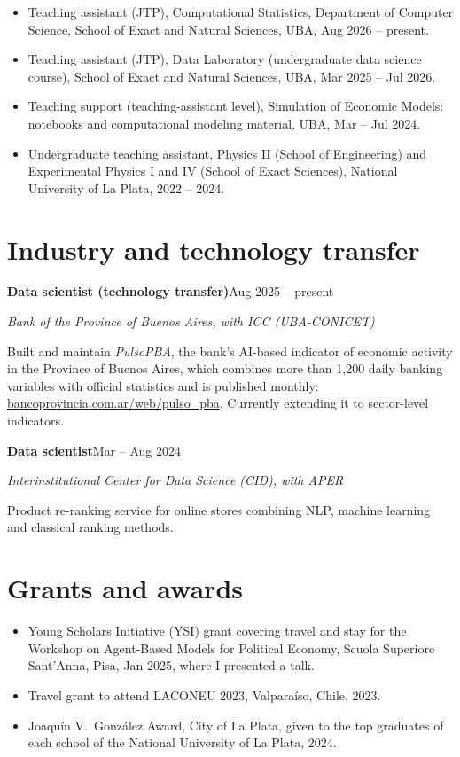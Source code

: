 \documentclass[10pt]{article}
\newcommand{\entry}[3]{{\bfseries #1}\hfill{\color{muted}\small #3}\par{\color{accent}\itshape #2}\par}
\begin{document}
\begin{itemize}
  \item Teaching assistant (JTP), Computational Statistics, Department of Computer Science, School of Exact and Natural Sciences, UBA, Aug 2026 -- present.
  \item Teaching assistant (JTP), Data Laboratory (undergraduate data science course), School of Exact and Natural Sciences, UBA, Mar 2025 -- Jul 2026.
  \item Teaching support (teaching-assistant level), Simulation of Economic Models: notebooks and computational modeling material, UBA, Mar -- Jul 2024.
  \item Undergraduate teaching assistant, Physics II (School of Engineering) and Experimental Physics I and IV (School of Exact Sciences), National University of La Plata, 2022 -- 2024.
\end{itemize}

\section{Industry and technology transfer}

\entry{Data scientist (technology transfer)}{Bank of the Province of Buenos Aires, with ICC (UBA-CONICET)}{Aug 2025 -- present}
Built and maintain \emph{PulsoPBA}, the bank's AI-based indicator of economic activity in the Province of Buenos Aires, which combines more than 1,200 daily banking variables with official statistics and is published monthly: \href{https://www.bancoprovincia.com.ar/web/pulso_pba}{\mbox{bancoprovincia.com.ar/web/pulso\_pba}}. Currently extending it to sector-level indicators.

\medskip
\entry{Data scientist}{Interinstitutional Center for Data Science (CID), with APER}{Mar -- Aug 2024}
Product re-ranking service for online stores combining NLP, machine learning and classical ranking methods.

\section{Grants and awards}

\begin{itemize}
  \item Young Scholars Initiative (YSI) grant covering travel and stay for the Workshop on Agent-Based Models for Political Economy, Scuola Superiore Sant'Anna, Pisa, Jan 2025, where I presented a talk.
  \item Travel grant to attend LACONEU 2023, Valparaíso, Chile, 2023.
  \item Joaquín V.~González Award, City of La Plata, given to the top graduates of each school of the National University of La Plata, 2024.
\end{itemize}
\end{document}
